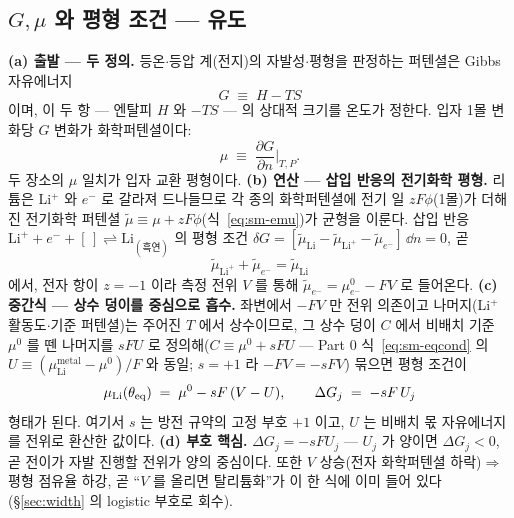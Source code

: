 \subsection{$G,\mu$ 와 평형 조건 --- 유도}\label{sec:center-eqcond}
\textbf{(a) 출발 --- 두 정의.} 등온$\cdot$등압 계(전지)의 자발성$\cdot$평형을 판정하는 퍼텐셜은 Gibbs 자유에너지
\begin{equation}
G\;\equiv\;H-TS
\label{eq:gibbsdef}
\end{equation}
이며, 이 두 항 --- 엔탈피 $H$ 와 $-TS$ --- 의 상대적 크기를 온도가 정한다. 입자 1몰 변화당 $G$ 변화가 화학퍼텐셜이다:
\begin{equation}
\mu\;\equiv\;\frac{\partial G}{\partial n}\Big|_{T,P}.
\label{eq:mudef}
\end{equation}
두 장소의 $\mu$ 일치가 입자 교환 평형이다. \textbf{(b) 연산 --- 삽입 반응의 전기화학 평형.} 리튬은 Li$^+$ 와 $e^-$ 로
갈라져 드나들므로 각 종의 화학퍼텐셜에 전기 일 $zF\phi$(1몰)가 더해진 전기화학 퍼텐셜 $\tilde\mu\equiv\mu+zF\phi$(식~\eqref{eq:sm-emu})가 균형을
이룬다. 삽입 반응 $\mathrm{Li}^++e^-+[\,]\rightleftharpoons\mathrm{Li}_{(\text{흑연})}$ 의 평형 조건
$\delta G=[\tilde\mu_\mathrm{Li}-\tilde\mu_{\mathrm{Li}^+}-\tilde\mu_{e^-}]\,\dd n=0$, 곧
\begin{equation}
\tilde\mu_{\mathrm{Li}^+}+\tilde\mu_{e^-}=\tilde\mu_\mathrm{Li}
\label{eq:eqbalance}
\end{equation}
에서, 전자 항이 $z=-1$ 이라 측정 전위 $V$ 를 통해 $\tilde\mu_{e^-}=\mu_{e^-}^0-FV$ 로 들어온다. \textbf{(c) 중간식 ---
상수 덩이를 중심으로 흡수.} 좌변에서 $-FV$ 만 전위 의존이고 나머지(Li$^+$ 활동도$\cdot$기준 퍼텐셜)는 주어진 $T$ 에서
상수이므로, 그 상수 덩이 $C$ 에서 비배치 기준 $\mu^0$ 를 뗀 나머지를 $sFU$ 로 정의해($C\equiv\mu^0+sFU$ ---
Part 0 식~\eqref{eq:sm-eqcond} 의 $U\equiv(\mu_\mathrm{Li}^\mathrm{metal}-\mu^0)/F$ 와 동일; $s=+1$ 라
$-FV=-sFV$) 묶으면 평형 조건이
\begin{equation}
\mu_\mathrm{Li}(\theta_{\mathrm{eq}})\;=\;\mu^0-sF\,(V-U),
\qquad \Delta G_j\;=\;-sF\,U_j
\label{eq:eqcond}
\end{equation}
형태가 된다. 여기서 $s$ 는 방전 규약의 고정 부호 $+1$ 이고, $U$ 는 비배치 몫 자유에너지를 전위로 환산한 값이다. \textbf{(d) 부호 핵심.} $\Delta G_j=-sFU_j$ ---
$U_j$ 가 양이면 $\Delta G_j<0$, 곧 전이가 자발 진행할 전위가 양의 중심이다. 또한 $V$ 상승(전자 화학퍼텐셜 하락)$\Rightarrow$
평형 점유율 하강, 곧 ``$V$ 를 올리면 탈리튬화''가 이 한 식에 이미 들어 있다(\S\ref{sec:width} 의 logistic 부호로 회수).


